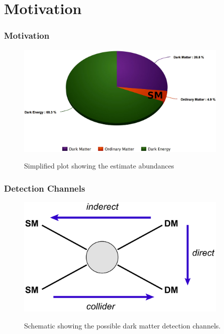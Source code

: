 \documentclass{beamer}
\numberwithin{figure}{section}
\begin{document}


\section{Motivation}
\begin{frame}
\frametitle{Motivation}

\begin{figure}[!tbp]
	\centering
	\includegraphics[width=0.9\textwidth]{pictures/pie}\label{fig2}
	\caption{{\scriptsize Simplified plot showing the estimate abundances}}
	
\end{figure}

\end{frame}


\begin{frame}
\frametitle{Detection Channels}

\begin{figure}[!tbp]
	\centering
	\includegraphics[width=0.9\textwidth]{pictures/Schem}\label{fig1}
	\caption{{\scriptsize Schematic showing the possible dark matter detection channels.}}
	
\end{figure}

\end{frame}
\end{document}

